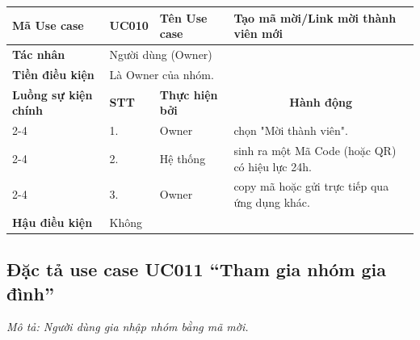 \documentclass[../main.tex]{subfiles}
\begin{document}
\begin{longtable}{|p{2.7cm}|p{0.8cm}|p{2.6cm}|p{7.3cm}|}
\hline
\cellcolor[HTML]{D5F5E3}\textbf{Mã Use case} & \multicolumn{1}{l|}{UC010} & \cellcolor[HTML]{D5F5E3}\textbf{Tên Use case} & Tạo mã mời/Link mời thành viên mới \\ \hline
\cellcolor[HTML]{D5F5E3}\textbf{Tác nhân} & \multicolumn{3}{p{10.7cm}|}{Người dùng (Owner)} \\ \hline
\cellcolor[HTML]{D5F5E3}\textbf{Tiền điều kiện} & \multicolumn{3}{p{10.7cm}|}{Là Owner của nhóm.} \\ \hline

\cellcolor[HTML]{D5F5E3}\textbf{Luồng sự kiện chính} & \cellcolor[HTML]{FDEBD0}\textbf{STT} & \cellcolor[HTML]{FDEBD0}\textbf{Thực hiện bởi} & \multicolumn{1}{c|}{\cellcolor[HTML]{FDEBD0}\textbf{Hành động}} \\ \cline{2-4} 
\cellcolor[HTML]{D5F5E3} & 1. & Owner & chọn "Mời thành viên". \\ \cline{2-4} 
\cellcolor[HTML]{D5F5E3} & 2. & Hệ thống & sinh ra một Mã Code (hoặc QR) có hiệu lực 24h. \\ \cline{2-4} 
\cellcolor[HTML]{D5F5E3} & 3. & Owner & copy mã hoặc gửi trực tiếp qua ứng dụng khác. \\ \hline

\cellcolor[HTML]{D5F5E3}\textbf{Hậu điều kiện} & \multicolumn{3}{p{10.7cm}|}{Không} \\ \hline
\end{longtable}
\endgroup

\subsection{Đặc tả use case UC011 ``Tham gia nhóm gia đình''}
\textit{Mô tả: Người dùng gia nhập nhóm bằng mã mời.}
\vspace{0.5cm}

\begingroup
\renewcommand{\arraystretch}{1.5}
\end{document}
